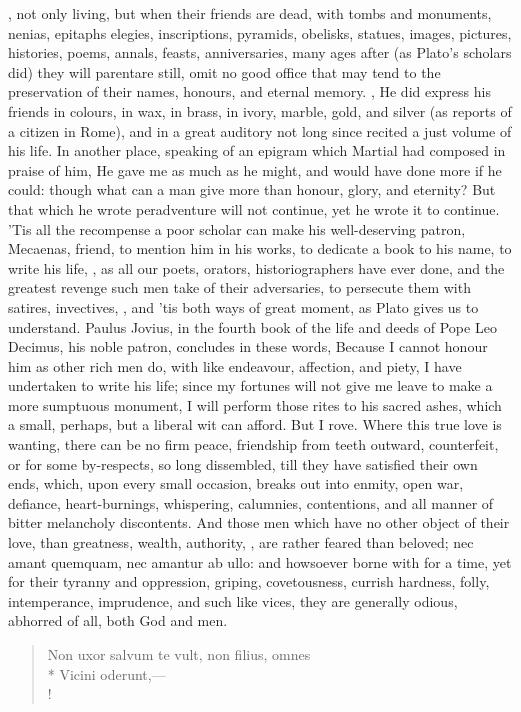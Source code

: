 {, not only living, but when
their friends are dead, with tombs and monuments, nenias, epitaphs
elegies, inscriptions, pyramids, obelisks, statues, images, pictures,
histories, poems, annals, feasts, anniversaries, many ages after (as
Plato's scholars did) they will parentare still, omit no good office
that may tend to the preservation of their names, honours, and eternal
memory. , \etc{} He did
express his friends in colours, in wax, in brass, in ivory, marble,
gold, and silver (as \Pliny{} reports of a citizen in Rome), and in a
great auditory not long since recited a just volume of his life. In
another place, speaking of an epigram which Martial had composed
in praise of him, He gave me as much as he might, and would have
done more if he could: though what can a man give more than honour,
glory, and eternity? But that which he wrote peradventure will not
continue, yet he wrote it to continue. 'Tis all the recompense a poor
scholar can make his well-deserving patron, Mecaenas, friend, to
mention him in his works, to dedicate a book to his name, to write his
life, \etc{}, as all our poets, orators, historiographers have ever done,
and the greatest revenge such men take of their adversaries, to
persecute them with satires, invectives, \etc{}, and 'tis both ways of
great moment, as  Plato gives us to understand. Paulus Jovius, in
the fourth book of the life and deeds of Pope Leo Decimus, his noble
patron, concludes in these words, Because I cannot honour him as
other rich men do, with like endeavour, affection, and piety, I have
undertaken to write his life; since my fortunes will not give me leave
to make a more sumptuous monument, I will perform those rites to his
sacred ashes, which a small, perhaps, but a liberal wit can afford. But
I rove. Where this true love is wanting, there can be no firm peace,
friendship from teeth outward, counterfeit, or for some by-respects, so
long dissembled, till they have satisfied their own ends, which, upon
every small occasion, breaks out into enmity, open war, defiance,
heart-burnings, whispering, calumnies, contentions, and all manner of
bitter melancholy discontents. And those men which have no other object
of their love, than greatness, wealth, authority, \etc{}, are rather
feared than beloved; nec amant quemquam, nec amantur ab ullo: and
howsoever borne with for a time, yet for their tyranny and oppression,
griping, covetousness, currish hardness, folly, intemperance,
imprudence, and such like vices, they are generally odious, abhorred of
all, both God and men.
%
\begin{latin}
\begin{verse}
Non uxor salvum te vult, non filius, omnes\\*
Vicini oderunt,---\\!
\end{verse}
\end{latin}

}
